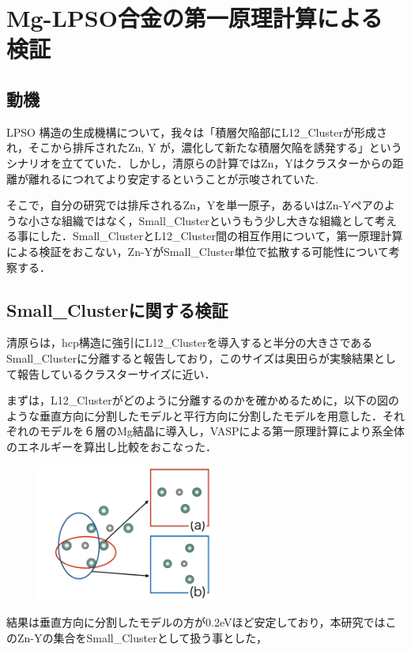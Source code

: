 \documentclass[10pt,a4j]{article}
\begin{document}
\section{Mg-LPSO合金の第一原理計算による検証}
\subsection{動機}
LPSO 構造の生成機構について，我々は「積層欠陥部にL12\_Clusterが形成され，そこから排斥されたZn, Y が，濃化して新たな積層欠陥を誘発する」というシナリオを立てていた．しかし，清原らの計算ではZn，Yはクラスターからの距離が離れるにつれてより安定するということが示唆されていた.

そこで，自分の研究では排斥されるZn，Yを単一原子，あるいはZn-Yペアのような小さな組織ではなく，Small\_Clusterというもう少し大きな組織として考える事にした．Small\_ClusterとL12\_Cluster間の相互作用について，第一原理計算による検証をおこない，Zn-YがSmall\_Cluster単位で拡散する可能性について考察する．

\subsection{Small\_Clusterに関する検証}
清原らは，hcp構造に強引にL12\_Clusterを導入すると半分の大きさであるSmall\_Clusterに分離すると報告しており，このサイズは奥田らが実験結果として報告しているクラスターサイズに近い．

まずは，L12\_Clusterがどのように分離するのかを確かめるために，以下の図のような垂直方向に分割したモデルと平行方向に分割したモデルを用意した．それぞれのモデルを６層のMg結晶に導入し，VASPによる第一原理計算により系全体のエネルギーを算出し比較をおこなった．

\begin{figure}[htbp]\begin{center}
\includegraphics[width=6cm,bb=0 0 442 500]{../figs/./MiniCluster.png}
\caption{}
\label{default}\end{center}\end{figure}
結果は垂直方向に分割したモデルの方が0.2eVほど安定しており，本研究ではこのZn-Yの集合をSmall\_Clusterとして扱う事とした，
\end{document}
